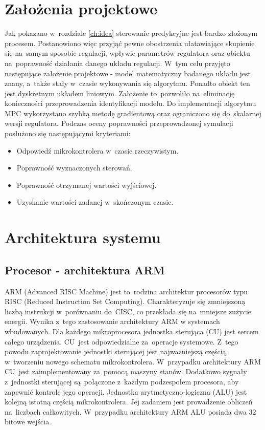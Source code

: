 \section{Założenia projektowe} \label{sec:assumptions}
Jak pokazano w~rozdziale \ref{ch:idea} sterowanie predykcyjne jest bardzo złożonym procesem.
Postanowiono więc przyjąć pewne obostrzenia ułatawiające skupienie się na~samym sposobie regulacji, 
wpływie parametrów regulatora oraz obiektu na~poprawność działania danego układu regulacji. W~tym
celu przyjęto następujące założenie projektowe - model matematyczny badanego układu jest znany, a~także
stały w~czasie wykonywania się algorytmu. Ponadto obiekt ten jest dyskretnym układem liniowym.
Założenie to~pozwoliło na~eliminację konieczności przeprowadzenia identyfikacji modelu. Do
implementacji algorytmu MPC wykorzystano szybką metodę gradientową oraz ograniczono się do~skalarnej
wersji regulatora.
Podczas oceny poprawności przeprowadzonej symulacji posłużono się następującymi kryteriami:  
\begin{itemize}
	\item Odpowiedź mikrokontrolera w~czasie rzeczywistym.
    \item Poprawność wyznaczonych sterowań.
    \item Poprawność otrzymanej wartości wyjściowej.
    \item Uzyskanie wartości zadanej w~skończonym czasie.
\end{itemize}

\section{Architektura systemu} \label{sec:system}

\subsection{Procesor - architektura ARM} \label{sec:arm}
ARM (Advanced RISC Machine) jest to~rodzina architektur procesorów typu RISC (Reduced Instruction
Set Computing). Charakteryzuje się zmniejszoną liczbą instrukcji w~porównaniu do~CISC, co
przekłada się na~mniejsze zużycie energii. Wynika z~tego zastosowanie architektury ARM
w systemach wbudowanych. Dla każdego mikroprocesora jednostka sterująca (CU) jest sercem całego
urządzenia. CU~jest odpowiedzialne za~operacje systemowe. Z~tego powodu zaprojektowanie jednostki
sterującej jest najważniejszą częścią w~tworzeniu nowego schematu mikrokontrolera. W~przypadku
architektury ARM CU~jest zaimplementowany za~pomocą maszyny stanów. Dodatkowo sygnały z~jednostki
sterującej są~połączone z~każdym podzespołem procesora, aby zapewnić kontrolę jego operacji.
Jednostka arytmetyczno-logiczna (ALU) jest kolejną istotną częścią mikrokontrolera. Jej zadaniem
jest prowadzenie obliczeń na~liczbach całkowitych. W~przypadku architektury ARM ALU posiada dwa
32 bitowe wejścia. \cite{arm_en} \cite{arm_pl} \cite{arm_ofc}

